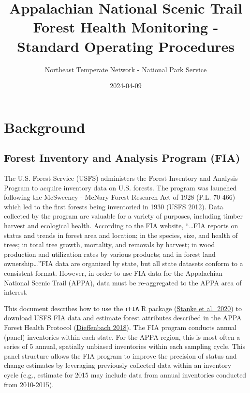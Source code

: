 \documentclass[
]{book}
\title{Appalachian National Scenic Trail Forest Health Monitoring - Standard Operating Procedures}
\author{Northeast Temperate Network - National Park Service}
\date{2024-04-09}
\begin{document}
\maketitle

{
\setcounter{tocdepth}{1}
\tableofcontents
}
\hypertarget{background}{%
\chapter{Background}\label{background}}

\hypertarget{forest-inventory-and-analysis-program-fia}{%
\section{Forest Inventory and Analysis Program (FIA)}\label{forest-inventory-and-analysis-program-fia}}

The U.S. Forest Service (USFS) administers the Forest Inventory and Analysis Program to acquire inventory data on U.S. forests. The program was launched following the McSweeney - McNary Forest Research Act of 1928 (P.L. 70-466) which led to the first forests being inventoried in 1930 (USFS 2012). Data collected by the program are valuable for a variety of purposes, including timber harvest and ecological health. According to the FIA website, ``\ldots FIA reports on status and trends in forest area and location; in the species, size, and health of trees; in total tree growth, mortality, and removals by harvest; in wood production and utilization rates by various products; and in forest land ownership\ldots{}''FIA data are organized by state, but all state datasets conform to a consistent format. However, in order to use FIA data for the Appalachian National Scenic Trail (APPA), data must be re-aggregated to the APPA area of interest.

This document describes how to use the \texttt{rFIA} R package (\href{https://doi.org/10.1016/j.envsoft.2020.104664}{Stanke et al.~2020}) to download USFS FIA data and estimate forest attributes described in the APPA Forest Health Protocol (\href{https://irma.nps.gov/DataStore/Reference/Profile/2257434}{Dieffenbach 2018}). The FIA program conducts annual (panel) inventories within each state. For the APPA region, this is most often a series of 5 annual, spatially unbiased inventories within each sampling cycle. This panel structure allows the FIA program to improve the precision of status and change estimates by leveraging previously collected data within an inventory cycle (e.g., estimate for 2015 may include data from annual inventories conducted from 2010-2015).
\end{document}
